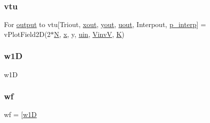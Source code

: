 \subsubsection{\texorpdfstring{vtu}{vtu}}
{\footnotesize\ttfamily For \hyperlink{a00623_a934120182a1459d17613528940e2bc61}{output} to vtu\mbox{[}Triout, \hyperlink{a00563_aa43b7c30923e8fcf939fe12082a19359}{xout}, \hyperlink{a00563_a440aa7a05dec25dc6fe586eaa162395b}{yout}, \hyperlink{a00563_a5c8d8342682becd112eb9de226d6053f}{uout}, Interpout, \hyperlink{a00563_a08a5429e87fabfe926dd685750b12894}{p\+\_\+interp}\mbox{]} = v\+Plot\+Field2D(2$\ast$\hyperlink{a00473_a5b9c4563028063ee53b517cce9aa701b}{N}, \hyperlink{a00605_ac98c3bb25378222646e977292011625f}{x}, y, \hyperlink{a00473_ab528855467ba0360924bbd0dd81edb35}{uin}, \hyperlink{a00473_a8ef32285093ff36729ef70bb1e8149c4}{VinvV}, \hyperlink{a00608_a16e4ef534cec559430e07e05eb71c719}{K})}

\mbox{\label{a00473_aa7de090b80d0a88d7d94e7763da3fe7e}} 
\subsubsection{\texorpdfstring{w1D}{w1D}}
{\footnotesize\ttfamily w1D}

\mbox{\label{a00473_a7bb9d681a4df47c616b79d82759cd0e6}} 
\subsubsection{\texorpdfstring{wf}{wf}}
{\footnotesize\ttfamily wf = \mbox{[}\hyperlink{a00473_aa7de090b80d0a88d7d94e7763da3fe7e}{w1D}}

